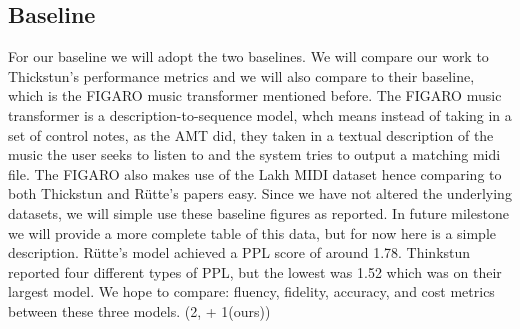 \documentclass[11pt]{article}
\begin{document}
\subsection{Baseline}
For our baseline we will adopt the two baselines. We will compare our work to Thickstun's performance metrics and we will also compare to their baseline, which is the FIGARO music transformer mentioned before. The FIGARO music transformer is a description-to-sequence model, whch means instead of taking in a set of control notes, as the AMT did, they taken in a textual description of the music the user seeks to listen to and the system tries to output a matching midi file. The FIGARO also makes use of the Lakh MIDI dataset hence comparing to both Thickstun and R{\"{u}}tte's papers easy. Since we have not altered the underlying datasets, we will simple use these baseline figures as reported. In future milestone we will provide a more complete table of this data, but for now here is a simple description. R{\"{u}}tte's model achieved a PPL score of around 1.78. Thinkstun reported four different types of PPL, but the lowest was 1.52 which was on their largest model. We hope to compare: fluency, fidelity, accuracy, and cost metrics between these three models. (2, + 1(ours))













\appendix

\end{document}
